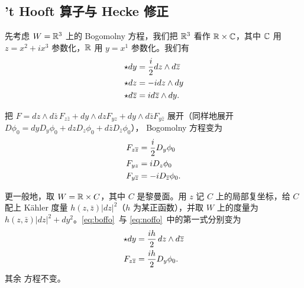 
\subsection{'t Hooft 算子与 Hecke 修正}

\label{sec:theck}

先考虑 $W=\Bbb{R}^3$ 上的 Bogomolny 方程，我们把 $\Bbb{R}^3$ 看作 $\Bbb{R}\times\Bbb{C}$，其中 $\Bbb{C}$ 用 $z=x^2+ix^3$ 参数化，$\Bbb{R}$ 用 $y=x^1$ 参数化。我们有 %
\setcounter{equation}{5}
\begin{equation}\label{eq:boffo}
\begin{aligned}\star dy&={i\over 2}dz\wedge
d\bar z\\
        \star dz&=-idz\wedge dy\\
        \star d\bar z& = id\bar z\wedge dy.\\\end{aligned}
\end{equation}

把 $F=dz\wedge d\bar z \,F_{z\bar z}+dy\wedge dz
        F_{yz}+dy\wedge d\bar z F_{y\bar z}$ 展开（同样地展开
$D\phi_0=dy D_y\phi_0+dz D_z\phi_0+d\bar z D_{\bar z}\phi_0$），
Bogomolny 方程变为 %
\setcounter{equation}{6}
\begin{equation}\label{eq:noffo}
\begin{aligned}F_{z\bar
z}&={i\over 2}D_y\phi_0\\
                    F_{yz}&=iD_z\phi_0\\
                    F_{y\bar z}&=-iD_{\bar z}\phi_0.\\\end{aligned}
\end{equation}

更一般地，取 $W= \Bbb{R}\times C$，其中 $C$ 是黎曼面。用 $z$ 记 $C$ 上的局部复坐标，给 $C$ 配上 Kähler 度量 $h(z,\bar z)|dz|^2$（$h$ 为某正函数），并取 $W$ 上的度量为 $h(z,\bar
z)|dz|^2+dy^2$。\eqref{eq:boffo}\ 与 \eqref{eq:noffo}\ 中的第一式分别变为 %
\setcounter{equation}{7}
\begin{equation}\label{eq:jungol}
\begin{aligned}\star dy& ={ih\over 2}\,dz\wedge
d\bar z\\ F_{z\bar z}&={ih\over 2}D_y\phi_0.\end{aligned}
\end{equation}
 其余
方程不变。

